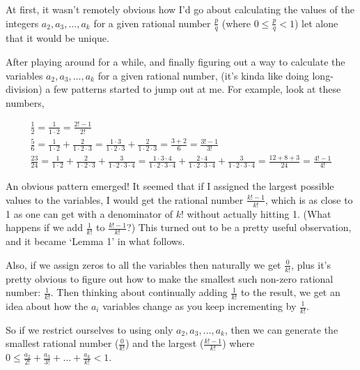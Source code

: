 \documentclass{article}
\begin{document}
At first, it wasn't remotely obvious how I'd go about calculating
the values of the integers \(a_2, a_3, \dots{}, a_k\) for a given rational number
\(\frac{p}{q}\)
(where
\(0 \le{} \frac{p}{q} < 1\))
let alone that it would be unique.

After playing around for a while, and finally figuring out
a way to calculate the variables \(a_2, a_3, \dots{}, a_k\)
for a given rational number,
(it's kinda like doing long-division)
a few patterns started to jump out at me.
For example, look at these numbers,

{\small
\bgroup
\setlength{\abovedisplayskip}{0pt}
\setlength{\belowdisplayskip}{0pt}
\begin{gather*}
\frac{1}{2}
= \frac{1}{1\cdot{}2}
= \frac{2!-1}{2!}\\
\frac{5}{6}
= \frac{1}{1\cdot{}2}
+ \frac{2}{1\cdot{}2\cdot{}3}
= \frac{1\cdot{}3}{1\cdot{}2\cdot{}3}
+ \frac{2}{1\cdot{}2\cdot{}3}
= \frac{3+2}{6}
= \frac{3!-1}{3!}\\
\frac{23}{24}
= \frac{1}{1\cdot{}2}
+ \frac{2}{1\cdot{}2\cdot{}3}
+ \frac{3}{1\cdot{}2\cdot{}3\cdot{}4}
= \frac{1\cdot{}3\cdot{}4}{1\cdot{}2\cdot{}3\cdot{}4}
+ \frac{2\cdot{}4}{1\cdot{}2\cdot{}3\cdot{}4}
+ \frac{3}{1\cdot{}2\cdot{}3\cdot{}4}
= \frac{12+8+3}{24}
= \frac{4!-1}{4!}
\end{gather*}
\egroup
}

An obvious pattern emerged!
It seemed 
that if I assigned the largest possible values to the variables,
I would get the rational number \(\frac{k!-1}{k!}\),
which is as close to 1 as one can get with a denominator of \(k!\) without actually
hitting 1. (What happens if we add \(\frac{1}{k!}\) to \(\frac{k!-1}{k!}\)?)
This turned out to be
a pretty useful observation, and it became `Lemma 1' in what follows.

Also, if we assign zeros to all the variables then naturally we get \(\frac{0}{k!}\), plus
it's pretty obvious to figure out how to make the smallest such non-zero rational number: \(\frac{1}{k!}\).
Then thinking about continually adding \(\frac{1}{k!}\) to the result, we get an idea about how the
\(a_i\) variables change as you keep incrementing by \(\frac{1}{k!}\).

So if we restrict ourselves to using only \(a_2, a_3, \dots{}, a_k\), then we
can generate the smallest rational number (\(\frac{0}{k!}\)) and the largest
(\(\frac{k!-1}{k!}\)) where
\(0 \le{} \frac{a_2}{2!} + \frac{a_3}{3!} + \dots{} + \frac{a_k}{k!} < 1\).
\end{document}
